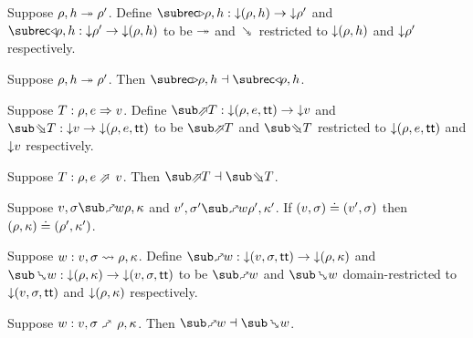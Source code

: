 \begin{definition}
   Suppose $\rho, h \twoheadrightarrow \rho'$. Define $\closeDefsFwdF{\rho,h}: \Below{(\rho, h)} \to \Below{\rho'}$ and $\closeDefsBwdF{\rho,h}: \Below{\rho'} \to \Below{(\rho, h)}$ to be $\twoheadrightarrow$ and $\closeDefsBwdR$ restricted to ${\downarrow}{(\rho, h)}$ and ${\downarrow}{\rho'}$ respectively.
\end{definition}

\begin{theorem}
\label{thm:core-language:closeDefs:gc}
   Suppose $\rho, h \twoheadrightarrow \rho'$.  Then $\closeDefsFwdF{\rho,h} \adjoint \closeDefsBwdF{\rho,h}$.
\end{theorem}

\begin{definition}
   Suppose $T: \rho, e \Rightarrow v$. Define $\evalFwdF{T}: \Below{(\rho, e, \TT)} \to \Below{v}$ and $\evalBwdF{T}: \Below{v} \to \Below{(\rho, e, \TT)}$ to be $\evalFwdR{T}$ and $\evalBwdR{T}$ restricted to ${\downarrow}{(\rho, e, \mathsf{tt})}$ and ${\downarrow}{v}$ respectively.
\end{definition}

\begin{theorem}
\label{thm:core-language:eval:gc}
   Suppose $T: \rho, e \evalFwdS v$.  Then $\evalFwdF{T} \adjoint \evalBwdF{T}$.
\end{theorem}

\begin{lemma}
   Suppose $v, \sigma \matchFwdR{w} \rho, \kappa$ and $v', \sigma' \matchFwdR{w} \rho', \kappa'$. If $(v, \sigma) \doteq (v', \sigma)$ then $(\rho, \kappa) \doteq (\rho', \kappa')$.
\end{lemma}

\begin{definition}
   Suppose $w: v, \sigma \rightsquigarrow \rho, \kappa$. Define $\matchFwdF{w}: \Below{(v,\sigma,\TT)} \to \Below{(\rho,\kappa)}$ and $\matchBwdF{w}: \Below{(\rho,\kappa)} \to \Below{(v,\sigma,\TT)}$ to be $\matchFwdR{w}$ and $\matchBwdR{w}$ domain-restricted to ${\downarrow}{(v,\sigma,\mathsf{tt})}$ and ${\downarrow}{(\rho,\kappa)}$ respectively.
\end{definition}

\begin{theorem}
\label{thm:core-language:match:gc}
   Suppose $w: v, \sigma \matchFwdS \rho, \kappa$.  Then $\matchFwdF{w} \adjoint \matchBwdF{w}$.
\end{theorem}
